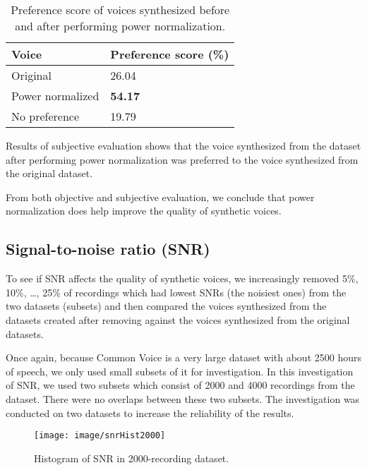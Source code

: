 \documentclass[12pt]{article}
\begin{document}
\begin{table}[]
\begin{center}
\caption{Preference score of voices synthesized before and after performing power normalization.}
\label{tab_subEvaPower}
\vspace{3mm}
\begin{tabular}{|l|l|}
\hline
Voice & Preference score (\%) \\
\hline
Original          & 26.04 \\
Power normalized  & \textbf{54.17} \\
No preference     & 19.79 \\
\hline
\end{tabular}
\end{center}
\end{table}

Results of subjective evaluation shows that the voice synthesized from the dataset after performing power normalization was preferred to the voice synthesized from the original dataset.

From both objective and subjective evaluation, we conclude that power normalization does help improve the quality of synthetic voices.

\subsection{Signal-to-noise ratio (SNR)}
To see if SNR affects the quality of synthetic voices, we increasingly removed 5\%, 10\%, …, 25\% of recordings which had lowest SNRs (the noisiest ones) from the two datasets (subsets) and then compared the voices synthesized from the datasets created after removing against the voices synthesized from the original datasets.

Once again, because Common Voice is a very large dataset with about 2500 hours of speech, we only used small subsets of it for investigation. In this investigation of SNR, we used two subsets which consist of 2000 and 4000 recordings from the dataset. There were no overlaps between these two subsets. The investigation was conducted on two datasets to increase the reliability of the results.

\begin{figure}[t]
\begin{center}
\texttt{[image: image/snrHist2000]}
\end{center}
\vspace{-0.3cm}
\caption[Histogram of SNR in 2000-recording dataset.]{Histogram of SNR in 2000-recording dataset.}
\label{fig_snrHist2000}
\end{figure}
\end{document}
